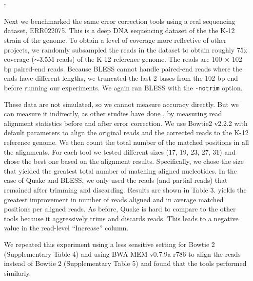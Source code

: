 \documentclass{bmcart}
\begin{document}
\paragraph{\ecolinoemph.}  Next we benchmarked the same error correction tools using a real sequencing dataset, ERR022075.
This is a deep DNA sequencing dataset of the the K-12 strain of the \ecoli genome.
To obtain a level of coverage more reflective of other projects, we randomly subsampled the reads in the dataset to obtain roughly 75x coverage ($\sim$3.5M reads) of the \ecoli K-12 reference genome.
The reads are 100 $\times$ 102 bp paired-end reads.
Because BLESS cannot handle paired-end reads where the ends have different lengths, we truncated the last 2 bases from the 102 bp end before running our experiments.
We again ran BLESS with the \verb+-notrim+ option.

 
These data are not simulated, so we cannot measure accuracy directly.  But we can measure it indirectly, as other studies have done \cite{heo2014bless}, by measuring read alignment statistics before and after error correction.  We use Bowtie2 \cite{langmead2012fast} v2.2.2 with default parameters to align the original reads and the corrected reads to the \ecoli K-12 reference genome.  We then count the total number of the matched positions in all the alignments.
For each tool we tested different \kmer sizes (17, 19, 23, 27, 31) and chose the best one based on the alignment results.  Specifically, we chose the \kmer size that yielded the greatest total number of matching aligned nucleotides.
In the case of Quake and BLESS, we only used the reads (and partial reads) that remained after trimming and discarding.
Results are shown in Table 3.  \tool yields the greatest improvement in number of reads aligned and in average matched positions per aligned reads.  As before, Quake is hard to compare to the other tools because it aggressively trims and discards reads.  This leads to a negative value in the read-level ``Increase'' column.

We repeated this experiment using a less sensitive setting for Bowtie 2 (Supplementary Table 4) and using BWA-MEM \cite{li2013aligning} v0.7.9a-r786 to align the reads instead of Bowtie 2 (Supplementary Table 5) and found that the tools performed similarly.

\end{document}

